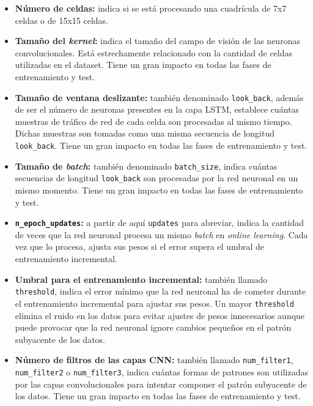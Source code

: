 \begin{itemize}
	\item \textbf{Número de celdas:} indica si se está procesando una cuadrícula de 7x7 celdas o de 15x15 celdas.

	\item \textbf{Tamaño del \textit{kernel}:} indica el tamaño del campo de visión de las neuronas convolucionales. Está estrechamente relacionado con la cantidad de celdas utilizadas en el dataset. Tiene un gran impacto en todas las fases de entrenamiento y test.

	\item \textbf{Tamaño de ventana deslizante:} también denominado \texttt{look\_back}, además de ser el número de neuronas presentes en la capa LSTM, establece cuántas muestras de tráfico de red de cada celda son procesadas al mismo tiempo. Dichas muestras son tomadas como una misma secuencia de longitud \texttt{look\_back}. Tiene un gran impacto en todas las fases de entrenamiento y test.

	\item \textbf{Tamaño de \textit{batch}:} también denominado \texttt{batch\_size}, indica cuántas secuencias de longitud \texttt{look\_back} son procesadas por la red neuronal en un mismo momento. Tiene un gran impacto en todas las fases de entrenamiento y test.

	\item \textbf{\texttt{n\_epoch\_updates}:} a partir de aquí \texttt{updates} para abreviar, indica la cantidad de veces que la red neuronal procesa un mismo \textit{batch} en \textit{online learning}. Cada vez que lo procesa, ajusta sus pesos si el error supera el umbral de entrenamiento incremental.

	\item \textbf{Umbral para el entrenamiento incremental:} también llamado \texttt{threshold}, indica el error mínimo que la red neuronal ha de cometer durante el entrenamiento incremental para ajustar sus pesos. Un mayor \texttt{threshold} elimina el ruido en los datos para evitar ajustes de pesos innecesarios aunque puede provocar que la red neuronal ignore cambios pequeños en el patrón subyacente de los datos.

	\item \textbf{Número de filtros de las capas CNN:} también llamado \texttt{num\_filter1}, \texttt{num\_filter2} o \texttt{num\_filter3}, indica cuántas formas de patrones son utilizadas por las capas convolucionales para intentar componer el patrón subyacente de los datos. Tiene un gran impacto en todas las fases de entrenamiento y test.
\end{itemize}

